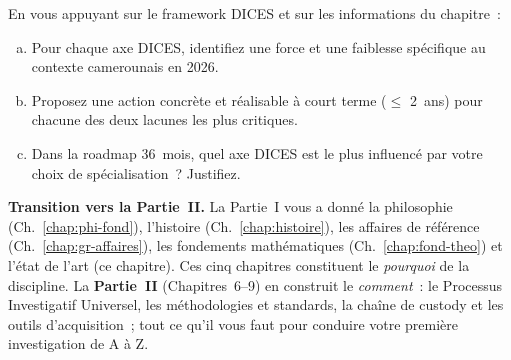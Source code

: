 \begin{boxexo}[title={\ding{45}\quad Exercice~5.3. Analyse DICES du Cameroun \niveauexpert}]
En vous appuyant sur le framework DICES et sur les informations du
chapitre~:
\begin{enumerate}[(a)]
    \item Pour chaque axe DICES, identifiez une force et une faiblesse
          spécifique au contexte camerounais en 2026.
    \item Proposez une action concrète et réalisable à court terme
          ($\leq$ 2~ans) pour chacune des deux lacunes les plus critiques.
    \item Dans la roadmap 36~mois, quel axe DICES est le plus influencé
          par votre choix de spécialisation~? Justifiez.
\end{enumerate}
\end{boxexo}

\bigskip

\begin{boxinfo}
\textbf{Transition vers la Partie~II.} La Partie~I vous a donné
la philosophie (Ch.~\ref{chap:phi-fond}), l'histoire
(Ch.~\ref{chap:histoire}), les affaires de référence
(Ch.~\ref{chap:gr-affaires}), les fondements mathématiques
(Ch.~\ref{chap:fond-theo}) et l'état de l'art (ce chapitre). Ces
cinq chapitres constituent le \emph{pourquoi} de la discipline. La
\textbf{Partie~II} (Chapitres~6--9) en construit le \emph{comment}~:
le Processus Investigatif Universel, les méthodologies et standards,
la chaîne de custody et les outils d'acquisition~; tout ce qu'il vous
faut pour conduire votre première investigation de A à Z.
\end{boxinfo}